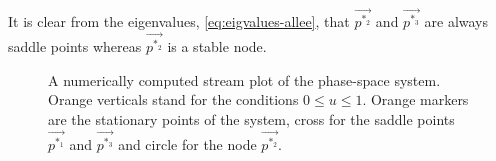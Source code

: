 It is clear from the eigenvalues, \cref{eq:eigvalues-allee}, that \(\vec{p^{*_2}}\) and \(\vec{p^{*_3}}\) are always
    saddle points whereas \(\vec{p^{*_2}}\) is a stable node.

\begin{figure}[htbp]
\centering
{}
\caption{
    A numerically computed stream plot of the phase-space system. Orange verticals stand for the conditions \(0
    \le u \le 1\). Orange markers are the stationary points of the system, cross for the saddle points \(\vec{p^{*_1}}\)
    and \(\vec{p^{*_3}}\) and circle for the node \(\vec{p^{*_2}}\).
    }
\label{fig:phase-portrait-kpp-allee-numerical}
\end{figure}%








\printbibliography
